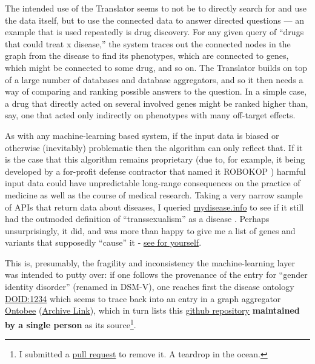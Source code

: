 \documentclass[10pt]{article}
\begin{document}
\begin{multicols}{2}
The intended use of the Translator seems to not be to directly search
for and use the data itself, but to use the connected data to answer
directed questions \cite{goelExplanationContainerCaseBased2021} 
--- an example that is used repeatedly is drug discovery. For any given
query of ``drugs that could treat x disease,'' the system traces out the
connected nodes in the graph from the disease to find its phenotypes,
which are connected to genes, which might be connected to some drug, and
so on. The Translator builds on top of a large number of databases and
database aggregators, and so it then needs a way of comparing and
ranking possible answers to the question. In a simple case, a drug that
directly acted on several involved genes might be ranked higher than,
say, one that acted only indirectly on phenotypes with many off-target
effects.

As with any machine-learning based system, if the input data is biased
or otherwise (inevitably) problematic then the algorithm can only
reflect that. If it is the case that this algorithm remains proprietary
(due to, for example, it being developed by a for-profit defense
contractor that named it ROBOKOP \cite{ROBOKOPCoVar2021} )
harmful input data could have unpredictable long-range consequences on
the practice of medicine as well as the course of medical research.
Taking a very narrow sample of APIs that return data about diseases, I
queried \href{https://mydisease.info}{mydisease.info} to see if it still
had the outmoded definition of ``transsexualism'' as a disease \cite{ramTransphobiaEncodedExamination2021} . Perhaps unsurprisingly, it
did, and was more than happy to give me a list of genes and variants
that supposedly ``cause'' it -
\href{http://mydisease.info/v1/query?q=\%22DOID\%3A10919\%22}{see for
yourself}.

This is, presumably, the fragility and inconsistency the
machine-learning layer was intended to putty over: if one follows the
provenance of the entry for ``gender identity disorder'' (renamed in
DSM-V), one reaches first the disease ontology
\href{https://web.archive.org/web/20211007053446/https://www.ebi.ac.uk/ols/ontologies/doid/terms?iri=http\%3A\%2F\%2Fpurl.obolibrary.org\%2Fobo\%2FDOID_1234}{DOID:1234}
which seems to trace back into an entry in a graph aggregator
\href{http://www.ontobee.org/ontology/DOID?iri=http://purl.obolibrary.org/obo/DOID_1234}{Ontobee}
(\href{https://web.archive.org/web/20210923110103/http://www.ontobee.org/ontology/DOID?iri=http://purl.obolibrary.org/obo/DOID_1234}{Archive
Link}), which in turn lists this
\href{https://github.com/jannahastings/mental-functioning-ontology}{github
repository} \textbf{maintained by a single person} as its
source\footnote{I submitted a
  \href{https://github.com/jannahastings/mental-functioning-ontology/pull/8}{pull
  request} to remove it. A teardrop in the ocean.}.


\end{multicols}
\end{document}
